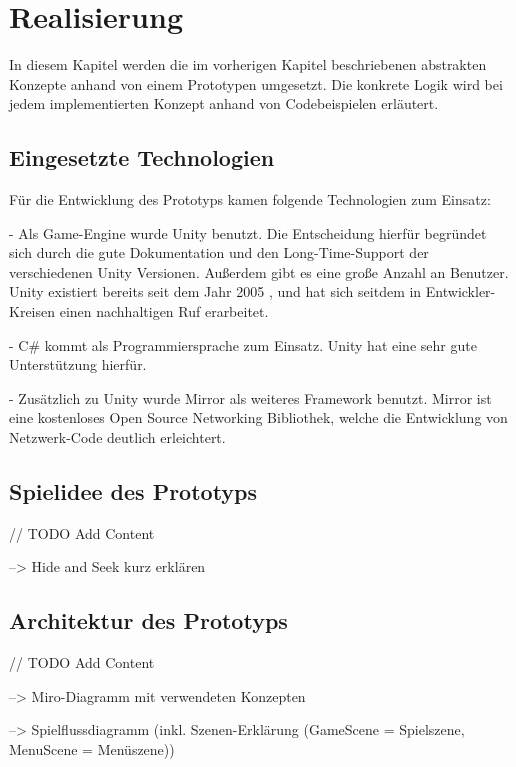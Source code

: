\chapter{Realisierung}
\label{sec:realisierung}

In diesem Kapitel werden die im vorherigen Kapitel beschriebenen abstrakten Konzepte anhand von einem Prototypen umgesetzt. Die konkrete Logik wird bei jedem implementierten Konzept anhand von Codebeispielen erläutert.

\section{Eingesetzte Technologien}

Für die Entwicklung des Prototyps kamen folgende Technologien zum Einsatz:

- Als Game-Engine wurde Unity\cite{Technologies.03.02.2022} benutzt. Die Entscheidung hierfür begründet sich durch die gute Dokumentation und den Long-Time-Support der verschiedenen Unity Versionen. Außerdem gibt es eine große Anzahl an Benutzer. Unity existiert bereits seit dem Jahr 2005 \cite{Wikipedia.2022c}, und hat sich seitdem in Entwickler-Kreisen einen nachhaltigen Ruf erarbeitet.

- C\# kommt als Programmiersprache zum Einsatz. Unity hat eine sehr gute Unterstützung hierfür.

- Zusätzlich zu Unity wurde Mirror\cite{.03.02.2022} als weiteres Framework benutzt. Mirror ist eine kostenloses Open Source Networking Bibliothek, welche die Entwicklung von Netzwerk-Code deutlich erleichtert.

\section{Spielidee des Prototyps}
\label{Spielidee}

// TODO Add Content

--> Hide and Seek kurz erklären

\section{Architektur des Prototyps}
\label{Architektur}

// TODO Add Content

--> Miro-Diagramm mit verwendeten Konzepten

--> Spielflussdiagramm (inkl. Szenen-Erklärung (GameScene = Spielszene, MenuScene = Menüszene))

